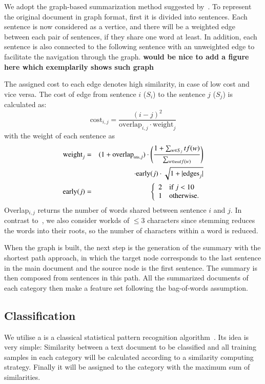 \documentclass{sigchi}
\begin{document}
We adopt the graph-based summarization method suggested by~\cite{sjobergh2006extraction}. 
To represent the original document in graph format, first it is divided into sentences. 
Each sentence is now considered as a vertice, and there will be a weighted edge between each pair of sentences, if they share one word at least.
In addition, each sentence is also connected to the following sentence with an unweighted edge to facilitate the navigation through the graph.
\textbf{would be nice to add a figure here which exemplarily shows such graph}

The assigned cost to each edge denotes high similarity, in case of low cost and vice versa. 
The cost of edge from sentence $i$ ($S_i$) to the sentence $j$ ($S_j$) is calculated as:
\begin{equation}
 \mbox{cost}_{i,j}=\frac{(i-j)^2}{\mbox{overlap}_{i,j}\cdot\mbox{weight}_j}
\end{equation}
with the weight of each sentence as 
\begin{eqnarray}
 \mbox{weight}_j&=&(1+\mbox{overlap}_{\mbox{\tiny title},j})\cdot\left(\frac{1+\sum_{w\in S_j}tf(w)}{\sum_{w\in\mbox{\tiny text}tf(w)}}\right)\nonumber\\
 &&\cdot\mbox{early}(j)\cdot\sqrt{1+|\mbox{edges}_j|}\\
 \mbox{early}(j)&=&\left\{\begin{array}{ll}
                         2 & \mbox{if }j<10\\
                         1 & \mbox{otherwise.}
                        \end{array}
\right.
\end{eqnarray}
Overlap$_{i,j}$ returns the number of words shared between sentence $i$ and $j$. 
In contrast to~\cite{sjobergh2006extraction}, we also consider workds of $\leq3$ characters since stemming reduces the words into their roots, so the number of characters within a word is reduced.

When the graph is built, the next step is the generation of the summary with the shortest path approach, in which the target node corresponds to the last sentence in the main document and the source node is the first sentence. 
The summary is then composed from sentences in this path. 
All the summarized documents of each category then make a feature set following the bag-of-words assumption.

\subsection{Classification}\label{sectionClassification}
We utilise a is a classical statistical pattern recognition algorithm~\cite{5190062}. 
Its idea is very simple: Similarity between a text document to be classified and all training samples in each category will be calculated according to a similarity computing strategy.
Finally it will be assigned to the category with the maximum sum of similarities.
\end{document}
